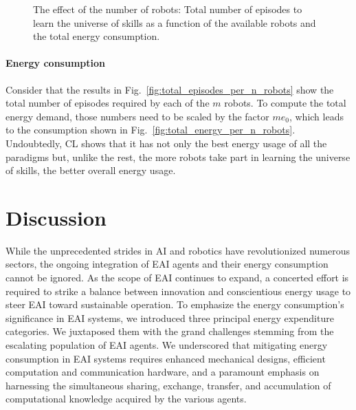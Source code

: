 \documentclass[12pt]{article}
\begin{document}
\begin{figure}[!h]
\begin{subfigure}[t]{0.45\textwidth}
	\end{subfigure}
	\hspace*{\fill}
	\caption[] {\label{fig:final_results} The effect of the number of robots:  Total number of episodes to learn the universe of skills as a function of the available robots and  the total energy consumption.}
\end{figure}

\paragraph*{Energy consumption}
Consider that the results in Fig.~\ref{fig:total_episodes_per_n_robots} show the total number of episodes required by each of the $m$ robots. To compute the total energy demand, those numbers need to be scaled by the factor $m e_0$, which leads to the consumption shown in Fig.~\ref{fig:total_energy_per_n_robots}. Undoubtedly, CL shows that it has not only the best energy usage of all the paradigms but, unlike the rest, the more robots take part in learning the universe of skills, the better overall energy usage.

\section*{Discussion}\label{sec:discussion}
While the unprecedented strides in AI and robotics have revolutionized numerous sectors, the ongoing integration of EAI agents and their energy consumption cannot be ignored. As the scope of EAI continues to expand, a concerted effort is required to strike a balance between innovation and conscientious energy usage to steer EAI toward sustainable operation. To emphasize the energy consumption's significance in EAI systems, we introduced three principal energy expenditure categories. We juxtaposed them with the grand challenges stemming from the escalating population of EAI agents. We underscored that mitigating energy consumption in EAI systems requires enhanced mechanical designs, efficient computation and communication hardware, and a paramount emphasis on harnessing the simultaneous sharing, exchange, transfer, and accumulation of computational knowledge acquired by the various agents.
\end{document}
